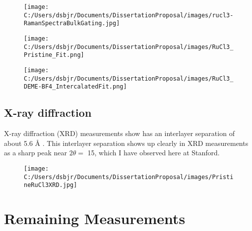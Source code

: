 \documentclass[11pt]{article}
\begin{document}
\begin{figure}
\centering
\begin{minipage}{0.3\textwidth}
\centering 
  {\texttt{[image: C:/Users/dsbjr/Documents/DissertationProposal/images/rucl3-RamanSpectraBulkGating.jpg]}\label{fig:f4}}
  \captionsetup{width=0.9\textwidth}
\end{minipage}%
\begin{minipage}{0.3\textwidth}
\centering
  {\texttt{[image: C:/Users/dsbjr/Documents/DissertationProposal/images/RuCl3\_Pristine\_Fit.png]}\label{fig:f5}}
  \captionsetup{width=0.9\textwidth}
\end{minipage}%
\begin{minipage}{0.3\textwidth}
\centering
	{\texttt{[image: C:/Users/dsbjr/Documents/DissertationProposal/images/RuCl3\_DEME-BF4\_IntercalatedFit.png]}\label{fig:f6}}
	\captionsetup{width=0.9\textwidth}
\end{minipage}
\end{figure}

\subsection{X-ray diffraction}

X-ray diffraction (XRD) measurements show \rucl has an interlayer separation of about 5.6 \r{A} \cite{Schollhorn1983}. This interlayer separation shows up clearly in XRD measurements as a sharp peak near $2\theta = $ 15\degree, which I have observed here at Stanford.

\begin{figure}
 \centering
	{\texttt{[image: C:/Users/dsbjr/Documents/DissertationProposal/images/PristineRuCl3XRD.jpg]}\label{fig:f4}}
  \captionsetup{width=0.5\textwidth}
\end{figure}

\section{Remaining Measurements}
\end{document}
